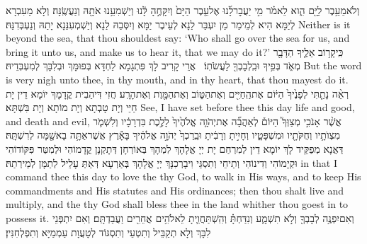 {וְלֹא\maqqaf מֵעֵ֥בֶר לַיָּ֖ם הִ֑וא לֵאמֹ֗ר מִ֣י יַעֲבׇר\maqqaf לָ֜נוּ אֶל\maqqaf עֵ֤בֶר הַיָּם֙ וְיִקָּחֶ֣הָ לָּ֔נוּ וְיַשְׁמִעֵ֥נוּ אֹתָ֖הּ וְנַעֲשֶֽׂנָּה׃}
{וְלָא מֵעִבְרָא לְיַמָּא הִיא לְמֵימַר מַן יִעְבַּר לַנָא לְעֵיבֶר יַמָּא וְיִסְּבַהּ לַנָא וְיַשְׁמְעִנַּנָא יָתַהּ וְנַעְבְּדִנַּהּ׃}
{Neither is it beyond the sea, that thou shouldest say: ‘Who shall go over the sea for us, and bring it unto us, and make us to hear it, that we may do it?’}{}
{כִּֽי\maqqaf קָר֥וֹב אֵלֶ֛יךָ הַדָּבָ֖ר מְאֹ֑ד בְּפִ֥יךָ וּבִֽלְבָבְךָ֖ לַעֲשֹׂתֽוֹ׃ \setuma }
{אֲרֵי קָרִיב לָךְ פִּתְגָמָא לַחְדָּא בְּפוּמָּךְ וּבְלִבָּךְ לְמִעְבְּדֵיהּ׃}
{But the word is very nigh unto thee, in thy mouth, and in thy heart, that thou mayest do it.}{}
{רְאֵ֨ה נָתַ֤תִּי לְפָנֶ֙יךָ֙ הַיּ֔וֹם אֶת\maqqaf הַֽחַיִּ֖ים וְאֶת\maqqaf הַטּ֑וֹב וְאֶת\maqqaf הַמָּ֖וֶת וְאֶת\maqqaf הָרָֽע׃}
{חֲזִי דִּיהַבִית קֳדָמָךְ יוֹמָא דֵין יָת חַיֵּי וְיָת טָבְתָא וְיָת מוֹתָא וְיָת בִּשְׁתָּא׃}
{See, I have set before thee this day life and good, and death and evil,}{}
{אֲשֶׁ֨ר אָנֹכִ֣י מְצַוְּךָ֮ הַיּוֹם֒ לְאַהֲבָ֞ה אֶת\maqqaf יְהֹוָ֤ה אֱלֹהֶ֙יךָ֙ לָלֶ֣כֶת בִּדְרָכָ֔יו וְלִשְׁמֹ֛ר מִצְוֺתָ֥יו וְחֻקֹּתָ֖יו וּמִשְׁפָּטָ֑יו וְחָיִ֣יתָ וְרָבִ֔יתָ וּבֵֽרַכְךָ֙ יְהֹוָ֣ה אֱלֹהֶ֔יךָ בָּאָ֕רֶץ אֲשֶׁר\maqqaf אַתָּ֥ה בָא\maqqaf שָׁ֖מָּה לְרִשְׁתָּֽהּ׃}
{דַּאֲנָא מְפַקֵּיד לָךְ יוֹמָא דֵין לְמִרְחַם יָת יְיָ אֱלָהָךְ לִמְהָךְ בְּאוֹרְחָן דְּתָקְנָן קֳדָמוֹהִי וּלְמִטַּר פִּקּוֹדוֹהִי וּקְיָמוֹהִי וְדִינוֹהִי וְתֵיחֵי וְתִסְגֵּי וִיבָרְכִנָּךְ יְיָ אֱלָהָךְ בְּאַרְעָא דְּאַתְּ עָלֵיל לְתַמָּן לְמֵירְתַהּ׃}
{in that I command thee this day to love the \lord\space thy God, to walk in His ways, and to keep His commandments and His statutes and His ordinances; then thou shalt live and multiply, and the \lord\space thy God shall bless thee in the land whither thou goest in to possess it.}{}
{וְאִם\maqqaf יִפְנֶ֥ה לְבָבְךָ֖ וְלֹ֣א תִשְׁמָ֑ע וְנִדַּחְתָּ֗ וְהִֽשְׁתַּחֲוִ֛יתָ לֵאלֹהִ֥ים אֲחֵרִ֖ים וַעֲבַדְתָּֽם׃}
{וְאִם יִתְפְּנֵי לִבָּךְ וְלָא תְקַבֵּיל וְתִטְעֵי וְתִסְגּוֹד לְטָעֲוָת עַמְמַיָּא וְתִפְלְחִנִּין׃}
